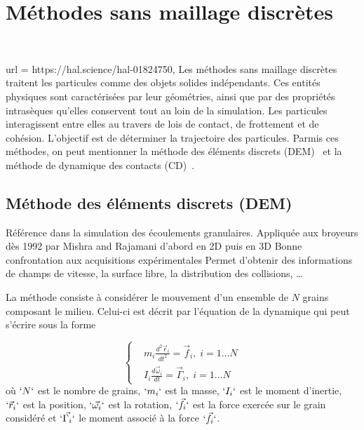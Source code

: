

\section{Méthodes sans maillage discrètes}~\label{sec:part_discret}

url         = {https://hal.science/hal-01824750},
Les méthodes sans maillage discrètes traitent les particules comme des objets solides indépendants. Ces entités physiques sont caractérisées par leur géométries, ainsi que par des propriétés intrasèques qu'elles conservent tout au loin de la simulation. Les particules interagissent entre elles au travers de lois de contact, de frottement et de cohésion. L'objectif est de déterminer la trajectoire des particules. Parmis ces méthodes, on peut mentionner la méthode des éléments discrets (DEM)~\cite{radjai:hal-00691805} et la méthode de dynamique des contacts (CD)~\cite{moreau:hal-01824750}.



\subsection{Méthode des éléments discrets (DEM)}
Référence dans la simulation des écoulements granulaires.
Appliquée aux broyeurs dès 1992 par Mishra and Rajamani d’abord en 2D puis en 3D
Bonne confrontation aux acquisitions expérimentales
Permet d’obtenir des informations de champs de vitesse, la surface libre, la distribution des collisions, …




La méthode consiste à considérer le mouvement d'un ensemble de $N$ grains composant le milieu. Celui-ci est décrit par l'équation de la dynamique qui peut s'écrire sous la forme

\begin{equation*}
    \left\{
    \begin{aligned}
         & m_{i} \frac{ d^{2}\vec{r}_i }{dt^2}=\vec{f}_{i},\; i=1\ldots N      \\
         & I_{i} \frac{d \vec{\omega}_{i}}{dt}=\vec{\Gamma}_{i},\; i=1\ldots N
    \end{aligned}
    \right.
\end{equation*}où $`N`$ est le nombre de grains, $`m_{i}`$ est la masse, $`I_i`$ est le moment d'inertie, $`\vec{r}_{i}`$ est la position, $`\vec{\omega_{i}}`$ est la rotation, $`\vec{f}_{i}`$ est la force exercée sur le grain considéré et $`\vec{\Gamma_{i}}`$ le moment associé à la force $`\vec{f}_{i}`$.

